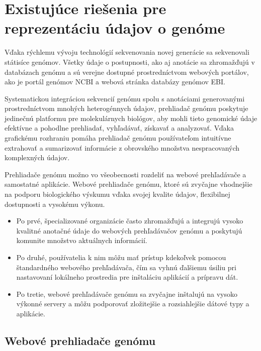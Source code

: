 \section{Existujúce riešenia pre reprezentáciu údajov o genóme}
Vďaka rýchlemu vývoju technológií sekvenovania novej generácie sa sekvenovali státisíce genómov.
Všetky údaje o postupnosti, ako aj anotácie sa zhromažďujú v databázach genómu a sú verejne dostupné
prostredníctvom webových portálov, ako je portál genómov NCBI a webová stránka databázy genómov EBI. %

Systematickou integráciou sekvencií genómu spolu s anotáciami generovanými prostredníctvom mnohých heterogénnych údajov, prehliadač genómu poskytuje jedinečnú platformu pre molekulárnych biológov, aby mohli tieto genomické údaje efektívne a pohodlne prehliadať, vyhľadávať, získavať a analyzovať.
Vďaka grafickému rozhraniu pomáha prehliadač genómu používateľom intuitívne extrahovať a sumarizovať informácie z obrovského množstva nespracovaných komplexných údajov.

Prehliadače genómu možno vo všeobecnosti rozdeliť na webové prehľadávače a samostatné aplikácie.
Webové prehliadače genómu, ktoré sú zvyčajne vhodnejšie na podporu biologického výskumu vďaka svojej kvalite údajov, flexibilnej dostupnosti a vysokému výkonu.
\begin{itemize}
	\item Po prvé, špecializované organizácie často zhromažďujú a integrujú vysoko kvalitné anotačné údaje do webových prehľadávačov genómu a poskytujú komunite množstvo aktuálnych informácií. 
	\item Po druhé, používatelia k nim môžu mať prístup kdekoľvek pomocou štandardného webového prehľadávača, čím sa vyhnú ďalšiemu úsiliu pri nastavovaní lokálneho prostredia pre inštaláciu aplikácií a prípravu dát. 
	\item Po tretie, webové prehľadávače genómu sa zvyčajne inštalujú na vysoko výkonné servery a môžu podporovať zložitejšie a rozsiahlejšie dátové typy a aplikácie.
\end{itemize}

\subsection{Webové prehliadače genómu}

